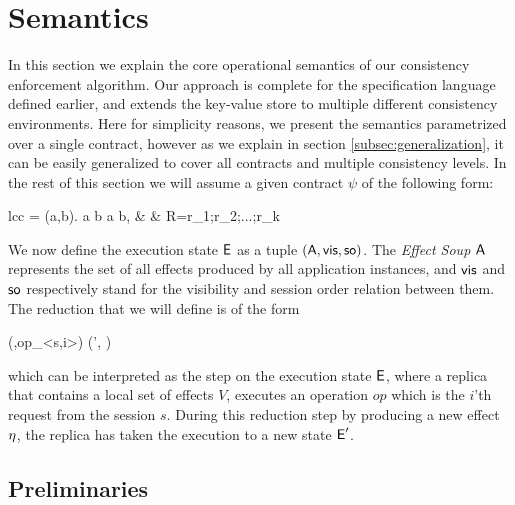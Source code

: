 %
%
\section{Semantics}
In this section we explain the core operational semantics of our
consistency enforcement algorithm. 
Our approach is complete for the specification language defined earlier,
and extends the key-value store to multiple different consistency
environments. Here for simplicity reasons, we present the semantics 
parametrized over a single contract,
however as we explain in section \ref{subsec:generalization}, it can be easily
generalized to cover all contracts and multiple consistency levels. In
the rest of this section we will assume a given contract $\psi$ of the
following form:
	\begin{smathpar}
	\begin{array}{lcc}
		\psi = \forall (a,b). a  b  \Rightarrow a
		 b, & \spc & R=r_1;r_2;...;r_k \\
	\end{array}
	\end{smathpar}

We now define the execution state ${\normalfont \textsf{E}}$ 
as a tuple $({\normalfont \textsf{A}},{\normalfont \textsf{vis}} ,{\normalfont \textsf{so}})$. The \emph{Effect Soup} ${\normalfont \textsf{A}}$ represents the set of all
effects produced by all application instances, and  ${\normalfont \textsf{vis}}$ and
${\normalfont \textsf{so}}$ respectively stand for the visibility and session order relation
between them. The reduction that we will define is of the form
\begin{smathpar}
(\E,op_{<s,i>}) \;\; (\E', \eff)
\end{smathpar}
which can be interpreted as the step on the execution state ${\normalfont \textsf{E}}$, where a replica
that contains a local set of effects $V$, executes an operation $op$
which is the $i$'th request from the session $s$. During this reduction step 
by producing a new effect $\eta$, the replica has taken the execution to
a new state ${\normalfont \textsf{E}}'$.


\subsection{Preliminaries}



